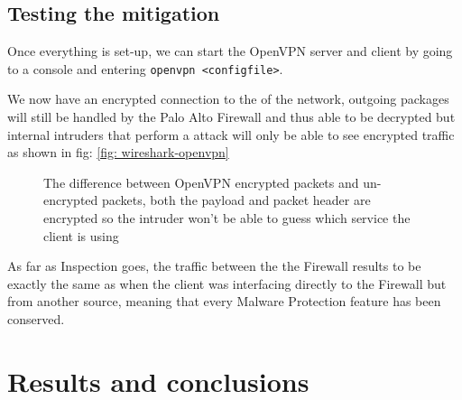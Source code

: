 \newpage

\section{Testing the mitigation}

Once everything is set-up, we can start the OpenVPN server and client by going to a console and entering \verb|openvpn <configfile>|.

We now have an encrypted connection to the  of the network, outgoing packages will still be handled by the Palo Alto Firewall and thus able to be  decrypted but internal intruders that perform a  attack will only be able to see encrypted traffic as shown in fig: \ref{fig: wireshark-openvpn}

\begin{figure}[!hb]
 \centering
 \vspace{0.5cm}
 \caption{The difference between OpenVPN encrypted packets and un-encrypted packets, both the payload and packet header are encrypted so the intruder won't be able to guess which service the client is using}
\end{figure}

As far as  Inspection goes, the traffic between the  the Firewall results to be exactly the same as when the client was interfacing directly to the Firewall but from another source, meaning that every Malware Protection feature has been conserved.

\chapter{Results and conclusions}

